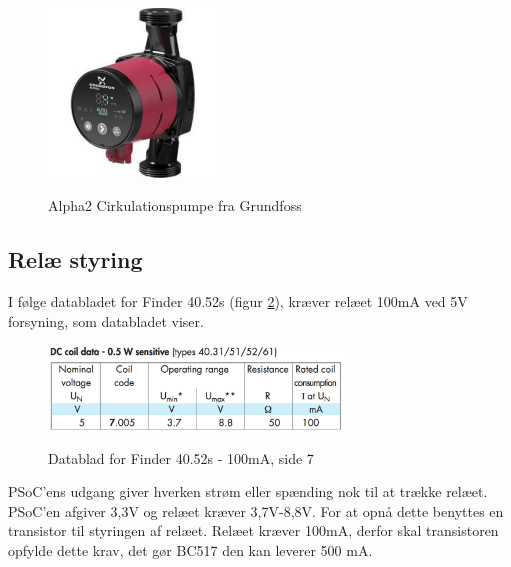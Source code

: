 \begin{figure}[H] \centering
{\includegraphics[width=0.4\textwidth]{filer/design/Billeder/Alpha2}}
\caption{Alpha2 Cirkulationspumpe fra Grundfoss}
\label{lab:Alpha2}
\raggedright
\end{figure} 

\subsection{Relæ styring}

I følge databladet for Finder 40.52s (figur \ref{lab:finder4052s}), kræver relæet 100mA ved 5V forsyning, som databladet viser.

\begin{figure}[H] \centering
{\includegraphics[width=0.7\textwidth]{filer/design/Billeder/finder4052s}}
\caption{Datablad for Finder 40.52s - 100mA, side 7}
\label{lab:finder4052s}
\raggedright
\end{figure} 

PSoC'ens udgang giver hverken strøm eller spænding nok til at trække relæet. PSoC'en afgiver 3,3V og relæet kræver 3,7V-8,8V. For at opnå dette benyttes en transistor til styringen af relæet. Relæet kræver 100mA, derfor skal transistoren opfylde dette krav, det gør BC517 den kan leverer 500 mA. \newline

